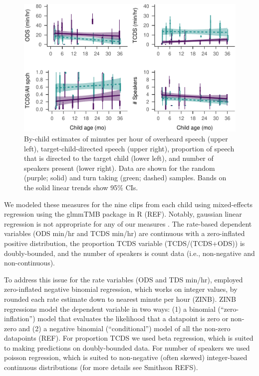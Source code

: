 \documentclass[floatsintext,man]{apa6}
\theoremstyle{definition}
\theoremstyle{definition}
\theoremstyle{definition}
\theoremstyle{remark}
\begin{document}
\begin{figure}
\centering
\includegraphics{Tseltal-CLE_files/figure-latex/fig1-1.pdf}
\caption{\label{fig:fig1}By-child estimates of minutes per hour of overheard
speech (upper left), target-child-directed speech (upper right),
proportion of speech that is directed to the target child (lower left),
and number of speakers present (lower right). Data are shown for the
random (purple; solid) and turn taking (green; dashed) samples. Bands on
the solid linear trends show 95\% CIs.}
\end{figure}

We modeled these measures for the nine clips from each child using
mixed-effects regression using the glmmTMB package in R (REF). Notably,
gaussian linear regression is not appropriate for any of our measures .
The rate-based dependent variables (ODS min/hr and TCDS min/hr) are
continuous with a zero-inflated positive distribution, the proportion
TCDS variable (TCDS/(TCDS+ODS)) is doubly-bounded, and the number of
speakers is count data (i.e., non-negative and non-continuous).

To address this issue for the rate variables (ODS and TDS min/hr),
employed zero-inflated negative binomial regression, which works on
integer values, by rounded each rate estimate down to nearest minute per
hour (ZINB). ZINB regressions model the dependent variable in two ways:
(1) a binomial (\enquote{zero-inflation}) model that evaluates the
likelihood that a datapoint is zero or non-zero and (2) a negative
binomial (\enquote{conditional}) model of all the non-zero datapoints
(REF). For proportion TCDS we used beta regression, which is suited to
making predictions on doubly-bounded data. For number of speakers we
used poisson regression, which is suited to non-negative (often skewed)
integer-based continuous distributions (for more details see Smithson
REFS).
\end{document}
